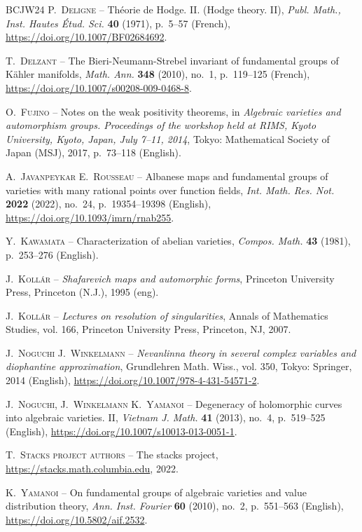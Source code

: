 \documentclass[11pt,english]{smfart}
\theoremstyle{plain}
\theoremstyle{definition}
\theoremstyle{remark}
\numberwithin{equation}{subsection}
\theoremstyle{plain}
\begin{document}
\begin{thebibliography}{BCJW24}
 	{\scshape P.~Deligne} -- {\og Th{\'e}orie de {Hodge}. {II}. ({Hodge} theory.
 		{II})\fg}, \emph{Publ. Math., Inst. Hautes {\'E}tud. Sci.} \textbf{40}
 	(1971), p.~5--57 (French), \url{https://doi.org/10.1007/BF02684692}.
 	
 	{\scshape T.~Delzant} -- {\og The {Bieri}-{Neumann}-{Strebel} invariant of
 		fundamental groups of {K{\"a}hler} manifolds\fg}, \emph{Math. Ann.}
 	\textbf{348} (2010), no.~1, p.~119--125 (French),
 	\url{https://doi.org/10.1007/s00208-009-0468-8}.
 	
 	{\scshape O.~Fujino} -- {\og Notes on the weak positivity theorems\fg}, in
 	\emph{Algebraic varieties and automorphism groups. Proceedings of the
 		workshop held at RIMS, Kyoto University, Kyoto, Japan, July 7--11, 2014},
 	Tokyo: Mathematical Society of Japan (MSJ), 2017, p.~73--118 (English).
 	
 	{\scshape A.~Javanpeykar {\normalfont \smfandname} E.~Rousseau} -- {\og
 		Albanese maps and fundamental groups of varieties with many rational points
 		over function fields\fg}, \emph{Int. Math. Res. Not.} \textbf{2022} (2022),
 	no.~24, p.~19354--19398 (English),
 	\url{https://doi.org/10.1093/imrn/rnab255}.
 	
 	{\scshape Y.~Kawamata} -- {\og Characterization of abelian varieties\fg},
 	\emph{Compos. Math.} \textbf{43} (1981), p.~253--276 (English).
 	
 	{\scshape J.~Koll{\'a}r} -- \emph{Shafarevich maps and automorphic forms},
 	Princeton University Press, Princeton (N.J.), 1995 (eng).
 	
 	{\scshape J.~Koll\'{a}r} -- \emph{Lectures on resolution of singularities},
 	Annals of Mathematics Studies, vol. 166, Princeton University Press,
 	Princeton, NJ, 2007.
 	
 	{\scshape J.~Noguchi {\normalfont \smfandname} J.~Winkelmann} --
 	\emph{Nevanlinna theory in several complex variables and diophantine
 		approximation}, Grundlehren Math. Wiss., vol. 350, Tokyo: Springer, 2014
 	(English), \url{https://doi.org/10.1007/978-4-431-54571-2}.
 	
 	{\scshape J.~Noguchi, J.~Winkelmann {\normalfont \smfandname} K.~Yamanoi} --
 	{\og Degeneracy of holomorphic curves into algebraic varieties. {II}\fg},
 	\emph{Vietnam J. Math.} \textbf{41} (2013), no.~4, p.~519--525 (English),
 	\url{https://doi.org/10.1007/s10013-013-0051-1}.
 	
 	{\scshape T.~{Stacks project authors}} -- {\og The stacks project\fg},
 	\url{https://stacks.math.columbia.edu}, 2022.
 	
 	{\scshape K.~Yamanoi} -- {\og On fundamental groups of algebraic varieties and
 		value distribution theory\fg}, \emph{Ann. Inst. Fourier} \textbf{60} (2010),
 	no.~2, p.~551--563 (English), \url{https://doi.org/10.5802/aif.2532}.
 	
 \end{thebibliography}
 	 
\end{document}

